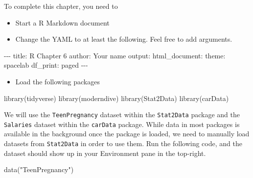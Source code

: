 \documentclass[
]{book}
\makeatletter
\newenvironment{Shaded}{\begin{snugshade}}{\end{snugshade}}
\newcommand{\FunctionTok}[1]{\textcolor[rgb]{0,0,0}{#1}}
\newcommand{\NormalTok}[1]{#1}
\newcommand{\SpecialCharTok}[1]{\textcolor[rgb]{0,0,0}{#1}}
\newcommand{\StringTok}[1]{\textcolor[rgb]{0.5,0.5,0.5}{#1}}
\providecommand{\tightlist}{%
  \setlength{\itemsep}{0pt}\setlength{\parskip}{0pt}}
\newenvironment{kframe}{%
\medskip{}
\setlength{\fboxsep}{.8em}
 \def\at@end@of@kframe{}%
 \ifinner\ifhmode%
  \def\at@end@of@kframe{\end{minipage}}%
  \begin{minipage}{\columnwidth}%
 \fi\fi%
 \def\FrameCommand##1{\hskip\@totalleftmargin \hskip-\fboxsep
 \colorbox{shadecolor}{##1}\hskip-\fboxsep
     \hskip-\linewidth \hskip-\@totalleftmargin \hskip\columnwidth}%
 \MakeFramed {\advance\hsize-\width
   \@totalleftmargin\z@ \linewidth\hsize
   \@setminipage}}%
 {\par\unskip\endMakeFramed%
 \at@end@of@kframe}
\renewenvironment{Shaded}{\begin{kframe}}{\end{kframe}}
\makeatother
\begin{document}
To complete this chapter, you need to

\begin{itemize}
\tightlist
\item
  Start a R Markdown document
\item
  Change the YAML to at least the following. Feel free to add arguments.
\end{itemize}

\begin{Shaded}
\begin{Highlighting}[]
\SpecialCharTok{{-}{-}{-}}
\NormalTok{title}\SpecialCharTok{:} \StringTok{\textquotesingle{}R Chapter 6\textquotesingle{}}
\NormalTok{author}\SpecialCharTok{:} \StringTok{\textquotesingle{}Your name\textquotesingle{}}
\NormalTok{output}\SpecialCharTok{:} 
\NormalTok{  html\_document}\SpecialCharTok{:}
\NormalTok{    theme}\SpecialCharTok{:}\NormalTok{ spacelab}
\NormalTok{    df\_print}\SpecialCharTok{:}\NormalTok{ paged}
\SpecialCharTok{{-}{-}{-}}
\end{Highlighting}
\end{Shaded}

\begin{itemize}
\tightlist
\item
  Load the following packages
\end{itemize}

\begin{Shaded}
\begin{Highlighting}[]
\FunctionTok{library}\NormalTok{(tidyverse)}
\FunctionTok{library}\NormalTok{(moderndive)}
\FunctionTok{library}\NormalTok{(Stat2Data)}
\FunctionTok{library}\NormalTok{(carData)}
\end{Highlighting}
\end{Shaded}

We will use the \texttt{TeenPregnancy} dataset within the \texttt{Stat2Data} package and the \texttt{Salaries} dataset within the \texttt{carData} package. While data in most packages is available in the background once the package is loaded, we need to manually load datasets from \texttt{Stat2Data} in order to use them. Run the following code, and the dataset should show up in your Environment pane in the top-right.

\begin{Shaded}
\begin{Highlighting}[]
\FunctionTok{data}\NormalTok{(}\StringTok{"TeenPregnancy"}\NormalTok{)}
\end{Highlighting}
\end{Shaded}
\end{document}
